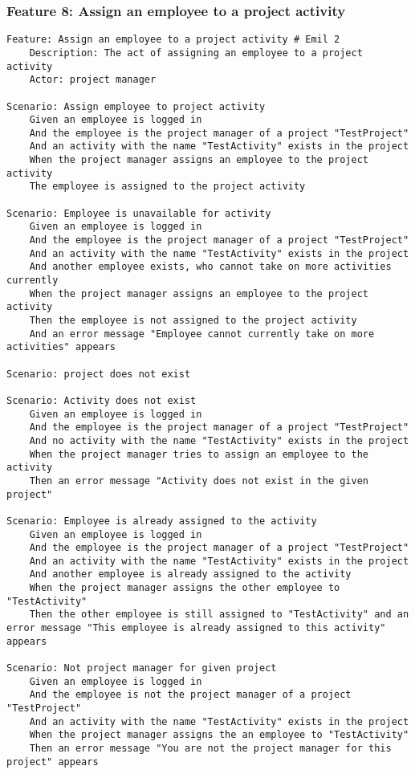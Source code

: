 \subsubsection{Feature 8: Assign an employee to a project activity}
\begin{lstlisting}
Feature: Assign an employee to a project activity # Emil 2
    Description: The act of assigning an employee to a project activity
    Actor: project manager

Scenario: Assign employee to project activity
    Given an employee is logged in
    And the employee is the project manager of a project "TestProject"
    And an activity with the name "TestActivity" exists in the project
    When the project manager assigns an employee to the project activity
    The employee is assigned to the project activity

Scenario: Employee is unavailable for activity
    Given an employee is logged in
    And the employee is the project manager of a project "TestProject"
    And an activity with the name "TestActivity" exists in the project
    And another employee exists, who cannot take on more activities currently
    When the project manager assigns an employee to the project activity
    Then the employee is not assigned to the project activity
    And an error message "Employee cannot currently take on more activities" appears

Scenario: project does not exist

Scenario: Activity does not exist
    Given an employee is logged in
    And the employee is the project manager of a project "TestProject"
    And no activity with the name "TestActivity" exists in the project
    When the project manager tries to assign an employee to the activity
    Then an error message "Activity does not exist in the given project"

Scenario: Employee is already assigned to the activity
    Given an employee is logged in
    And the employee is the project manager of a project "TestProject" 
    And an activity with the name "TestActivity" exists in the project
    And another employee is already assigned to the activity
    When the project manager assigns the other employee to "TestActivity"
    Then the other employee is still assigned to "TestActivity" and an error message "This employee is already assigned to this activity" appears

Scenario: Not project manager for given project
    Given an employee is logged in
    And the employee is not the project manager of a project "TestProject" 
    And an activity with the name "TestActivity" exists in the project
    When the project manager assigns the an employee to "TestActivity"
    Then an error message "You are not the project manager for this project" appears
\end{lstlisting}


